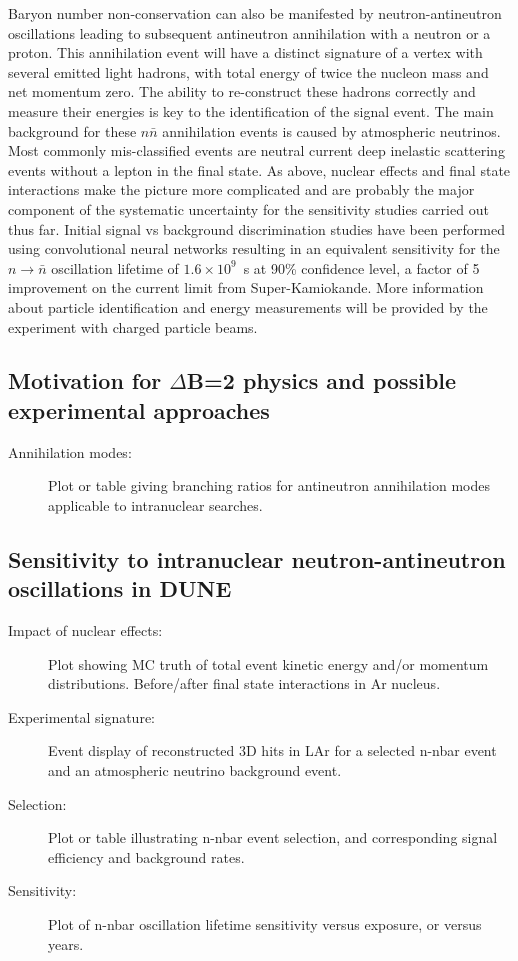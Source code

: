 Baryon number non-conservation can also be manifested by neutron-antineutron oscillations leading to subsequent antineutron annihilation with a neutron or a proton. This annihilation event will have a distinct signature of a vertex with several emitted light hadrons, with total energy of twice the nucleon mass and net momentum zero. The ability to re-construct these hadrons correctly and measure their energies is key to the identification of the signal event. The main background for these $n\bar n$ annihilation events is caused by atmospheric neutrinos. Most commonly mis-classified events are neutral current deep inelastic scattering events without a lepton in the final state. As above, nuclear effects and final state interactions make the picture more complicated and are probably the major component of the systematic uncertainty for the sensitivity studies carried out thus far.  Initial signal vs background discrimination studies have been performed using convolutional neural networks resulting in an equivalent sensitivity for the $n\rightarrow \bar n$ oscillation lifetime of $1.6 \times 10^9$~s at 90\% confidence level, a factor of 5 improvement on the current limit from Super-Kamiokande.
More information about particle identification and energy measurements will be provided by the  experiment with charged particle beams. 
\subsection{Motivation for $\Delta$B=2 physics and possible experimental approaches}
\label{subsec:nonaccel-nnbar-intro}

\begin{description}
\item[Annihilation modes:] Plot or table giving branching ratios for antineutron annihilation modes applicable to intranuclear searches.
\end{description}


\subsection{Sensitivity to intranuclear neutron-antineutron oscillations in DUNE}
\label{subsec:nonaccel-nnbar-dunesensitivity}

\begin{description}
\item[Impact of nuclear effects:] Plot showing MC truth of total event kinetic energy and/or momentum distributions. Before/after final state interactions in Ar nucleus.
\item[Experimental signature:] Event display of reconstructed 3D hits in LAr for a selected n-nbar event and an atmospheric neutrino background event.
\item[Selection:] Plot or table illustrating n-nbar event selection, and corresponding signal efficiency and background rates.
\item[Sensitivity:] Plot of n-nbar oscillation lifetime sensitivity versus exposure, or versus years.
\end{description}


